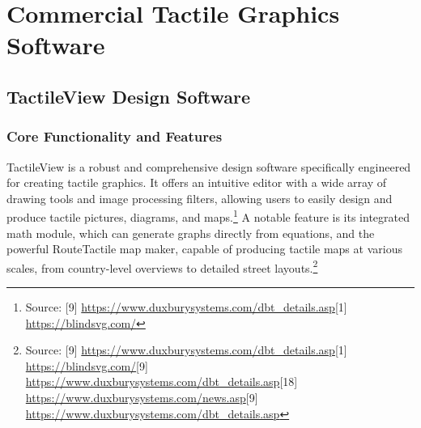 \section{Commercial Tactile Graphics Software}

\subsection{TactileView Design Software}

\subsubsection{Core Functionality and Features}

TactileView is a robust and comprehensive design software specifically engineered for creating tactile graphics. It offers an intuitive editor with a wide array of drawing tools and image processing filters, allowing users to easily design and produce tactile pictures, diagrams, and maps.\footnote{Source: [9] \url{https://www.duxburysystems.com/dbt_details.asp}[1] \url{https://blindsvg.com/}} A notable feature is its integrated math module, which can generate graphs directly from equations, and the powerful RouteTactile map maker, capable of producing tactile maps at various scales, from country-level overviews to detailed street layouts.\footnote{Source: [9] \url{https://www.duxburysystems.com/dbt_details.asp}[1] \url{https://blindsvg.com/}[9] \url{https://www.duxburysystems.com/dbt_details.asp}[18] \url{https://www.duxburysystems.com/news.asp}[9] \url{https://www.duxburysystems.com/dbt_details.asp}}

